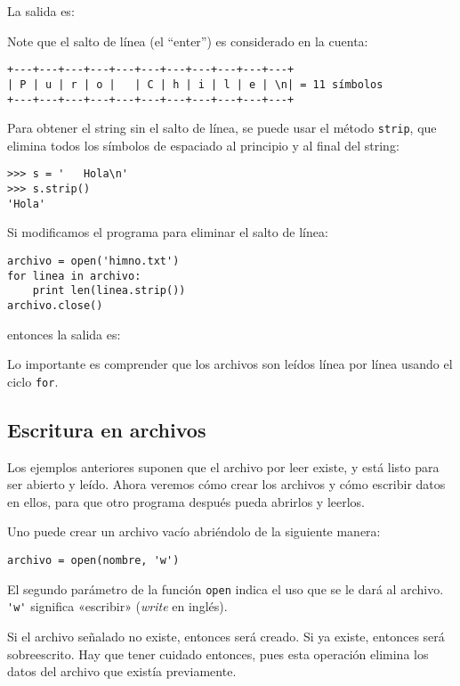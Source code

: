 La salida es:

Note que el salto de línea (el ``enter'') es considerado en la cuenta:

\begin{lstlisting}
+---+---+---+---+---+---+---+---+---+---+---+
| P | u | r | o |   | C | h | i | l | e | \n| = 11 símbolos
+---+---+---+---+---+---+---+---+---+---+---+
\end{lstlisting}

Para obtener el string sin el salto de línea, se puede usar el método
\lstinline!strip!, que elimina todos los símbolos de espaciado al
principio y al final del string:

\begin{lstlisting}
>>> s = '   Hola\n'
>>> s.strip()
'Hola'
\end{lstlisting}

Si modificamos el programa para eliminar el salto de línea:

\begin{lstlisting}
archivo = open('himno.txt')
for linea in archivo:
    print len(linea.strip())
archivo.close()
\end{lstlisting}

entonces la salida es:

Lo importante es comprender que los archivos son leídos línea por línea
usando el ciclo \lstinline!for!.

\subsection{Escritura en archivos}

Los ejemplos anteriores suponen que el archivo por leer existe, y está
listo para ser abierto y leído. Ahora veremos cómo crear los archivos y
cómo escribir datos en ellos, para que otro programa después pueda
abrirlos y leerlos.

Uno puede crear un archivo vacío abriéndolo de la siguiente manera:

\begin{lstlisting}
archivo = open(nombre, 'w')
\end{lstlisting}

El segundo parámetro de la función \lstinline!open! indica el uso que se
le dará al archivo. \lstinline!'w'! significa «escribir» (\emph{write}
en inglés).

Si el archivo señalado no existe, entonces será creado. Si ya existe,
entonces será sobreescrito. Hay que tener cuidado entonces, pues esta
operación elimina los datos del archivo que existía previamente.

